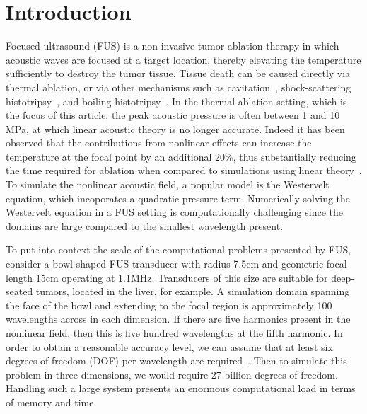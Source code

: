 \documentclass[preprint]{JASA}
\newcommand{\red}[1]{{\color{red} #1}}
\begin{document}

\maketitle


\section{\label{sec:1} Introduction}
\red{Focused ultrasound (FUS)} is a non-invasive tumor ablation 
therapy in which acoustic waves are focused at a target location, thereby 
elevating the temperature sufficiently to destroy the tumor tissue. Tissue 
death can be caused directly via thermal ablation, or via other 
mechanisms such as cavitation~\cite{vlaisavljevich2013image,izadifar2017mechanical},
\red{shock-scattering histotripsy~\cite{maxwell2011cavitation}, and boiling histotripsy~\cite{khokhlova2011controlled}}. 
In the thermal ablation setting, which is the focus of this article, the peak acoustic 
pressure is often between 1 and 10 MPa, at which linear acoustic theory is no longer accurate. 
Indeed it has been observed that the contributions from nonlinear effects can
increase the temperature at the focal point by an additional 20\%,
thus substantially reducing the time required for ablation when compared to simulations
using linear theory~\cite{solovchuk2014temperature}.
To simulate the nonlinear 
acoustic field, a popular model is the Westervelt equation,
which incoporates a quadratic pressure term. Numerically solving the 
Westervelt equation in a \red{FUS} setting is computationally challenging since the
domains are large compared to the smallest wavelength present. 

To put into context the scale of the computational problems presented by 
\red{FUS}, consider a bowl-shaped \red{FUS} transducer with radius 7.5cm and 
geometric focal length 15cm operating at 1.1MHz. 
Transducers of this size are suitable for deep-seated tumors, located in the liver,
for example. A simulation domain spanning the face of the bowl and extending to the 
focal region is approximately 100 wavelengths across in each dimension. If there 
are five harmonics present in the nonlinear field, then this is five hundred 
wavelengths at the fifth harmonic. In order to obtain a reasonable accuracy level,
we can assume that at least six degrees of freedom (DOF) per wavelength are required~\cite{marburg2008discretization}.
Then to simulate this problem in three dimensions, we would require 27 billion 
degrees of freedom. Handling such a large system
presents an enormous computational load in terms of memory and time. 
\end{document}

